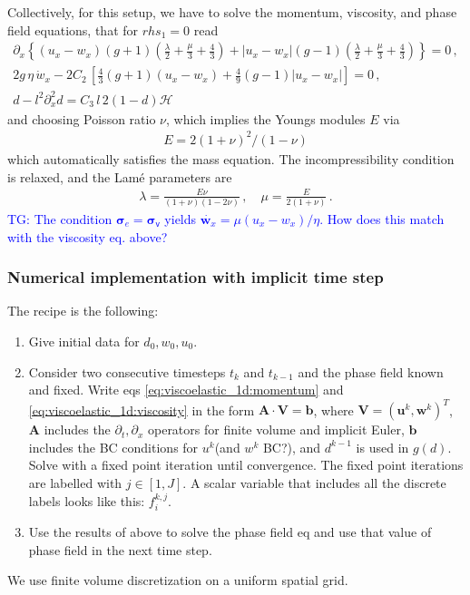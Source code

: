 \documentclass[11pt,a4paper]{article}
\newcommand{\p}{\partial}
\newcommand{\tg}[1]{\textcolor{blue}{TG: #1} }
\newcommand{\bb}[1]{\boldsymbol{#1}}
\newcommand{\varv}{\mathsf{v}}
\begin{document}
Collectively, for this setup, we have to solve the momentum, viscosity, and phase field equations, that for $rhs_1=0$ read
\begin{subequations}
\begin{align}
    \p_x \left\{ 
        (u_x-w_x)(g+1)
        \left(\frac{\lambda}{2} + \frac{\mu}{3} + \frac{4}{3} \right)
        +
        |u_x-w_x|(g-1)
        \left(\frac{\lambda}{2} + \frac{\mu}{3} + \frac{4}{3} \right)
        \right\}
    = 0
    \,,
    \label{eq:viscoelastic_1d:momentum}
    \\
     2 g \, \eta \, \dot{w}_x 
    - 
    2 C_2 \, 
    \left[ \frac{4}{3} (g+1) (u_x-w_x)
    + \frac{4}{9} (g-1) |u_x-w_x|
    \right] 
    =0 
    \,,
    \label{eq:viscoelastic_1d:viscosity}
    \\
    d - l^2 \p_x^2 d = C_3 \, l \, 2 (1-d) \mathcal{H}
    \label{eq:viscoelastic_1d_phase_field}
\end{align}
\label{eq:viscoelastic_1d}
\end{subequations}
and choosing Poisson ratio $\nu$, which implies the Youngs modules $E$ via
\begin{align*}
    E = 2(1+\nu)^2/(1-\nu)
\end{align*}
which automatically satisfies the mass equation. The incompressibility condition is relaxed, and the Lam\'e parameters are
\begin{align*}
    \lambda = \frac{E \nu}{(1+\nu)(1-2\nu)}
    \,, \quad
    \mu = \frac{E}{2(1+\nu)}
    \,.
\end{align*}
\tg{The condition $\bb{\sigma}_e = \bb{\sigma}_\varv$ yields $\dot{\bb{w}_x} = \mu (u_x-w_x)/\eta$. How does this match with the viscosity eq. above?}

\subsubsection{Numerical implementation with implicit time step}

The recipe is the following: 
\begin{enumerate}
    \item Give initial data for $d_0,w_0,u_0$.
    \item Consider two consecutive timesteps $t_k$ and $t_{k-1}$ and the phase field known and fixed. Write eqs \eqref{eq:viscoelastic_1d:momentum} and \eqref{eq:viscoelastic_1d:viscosity} in the form $\bb{A} \cdot \bb{V} = \bb{b}$, where $\bb{V} = (\bb{u}^k,\bb{w}^k)^T$, $\bb{A}$ includes the $\p_t, \p_x$ operators for finite volume and implicit Euler, $\bb{b}$ includes the BC conditions for $u^k$(and $w^k$ BC?), and $d^{k-1}$ is used in $g(d)$. Solve with a fixed point iteration until convergence. The fixed point iterations are labelled with $j \in[1,J]$. A scalar variable that includes all the discrete labels looks like this: $f_i^{k,j}$.
    \item Use the results of above to solve the phase field eq and use that value of phase field in the next time step.
\end{enumerate}
We use finite volume discretization on a uniform spatial grid.
\end{document}

